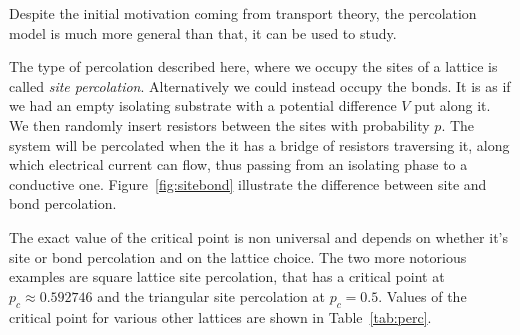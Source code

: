 Despite the initial motivation coming from transport theory, the percolation
model is much more general than that, it can be used to study.

The type of percolation described here, where we occupy the sites of a lattice
is called \textit{site percolation}. Alternatively we could instead occupy the
bonds. It is as if we had an empty isolating substrate with a potential
difference $V$ put along it. We then randomly insert resistors between the
sites with probability $p$. The system will be percolated when the it has a
bridge of resistors traversing it, along which electrical current can flow,
thus passing from an isolating phase to a conductive one.
Figure~\ref{fig:sitebond} illustrate the difference between site and bond
percolation.

The exact value of the critical point is non universal and depends on whether
it's site or bond percolation and on the lattice choice. The two more notorious
examples are square lattice site percolation, that has a critical point at
$p_c\approx0.592746$ and the triangular site percolation at $p_c=0.5$. Values
of the critical point for various other lattices are shown in
Table~\ref{tab:perc}.


